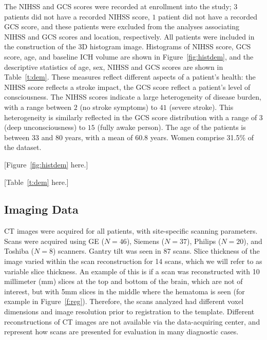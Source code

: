 \documentclass[10pt]{article}\usepackage[]{graphicx}\usepackage[]{color}
\begin{document}
%
                 
The NIHSS and GCS scores were recorded at enrollment into the study; $3$ patients did not have a recorded NIHSS score, $1$ patient did not have a recorded GCS score, and these patients were excluded from the analyses associating NIHSS and GCS scores and location, respectively.  All patients were included in the construction of the 3D histogram image.  Histograms of NIHSS score, GCS score, age, and baseline ICH volume are shown in Figure~\ref{fig:histdem}, and the descriptive statistics of age, sex, NIHSS and GCS scores are shown in Table~\ref{t:dem}. These measures reflect different aspects of a patient's health: the NIHSS score reflects a stroke impact, the GCS score reflect a patient's level of consciousness.  The NIHSS scores indicate a large heterogeneity of disease burden, with a range between $2$ (no stroke symptoms) to $41$ (severe stroke).  This heterogeneity is similarly reflected in the GCS score distribution with a range of $3$ (deep unconsciousness) to $15$ (fully awake person). The age of the patients is between 33 and 80 years, with a mean of 60.8 years.  Women comprise 31.5\% of the dataset.

[Figure~\ref{fig:histdem} here.]

[Table~\ref{t:dem} here.]



\subsection*{Imaging Data}
CT images were acquired for all patients, with site-specific scanning parameters.  Scans were acquired using GE ($N=46$), Siemens ($N=37$), Philips ($N=20$), and Toshiba ($N=8$) scanners. Gantry tilt was seen in 87 scans.  Slice thickness of the image varied within the scan reconstruction for 14 scans, which we will refer to  as variable slice thickness. An example of this is if a scan was reconstructed with 10 millimeter (mm) slices at the top and bottom of the brain, which are not of interest, but with 5mm slices in the middle where the hematoma is seen (for example in Figure~\ref{f:reg}\protect{}).  Therefore, the scans analyzed had different voxel dimensions and image resolution prior to registration to the template.  Different reconstructions of CT images are not available via the data-acquiring center, and represent how scans are presented for evaluation in many diagnostic cases.
\end{document}
